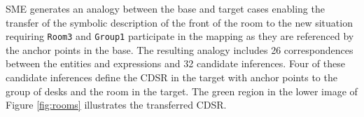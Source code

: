 \documentclass[letterpaper]{article}
\newcommand{\fw}[1]{\texttt{#1}}
\begin{document}
SME generates an analogy between the base and target cases enabling the transfer of the symbolic description of the front of the room to the new situation requiring \fw{Room3} and \fw{Group1} participate in the mapping as they are referenced by the anchor points in the base. The resulting analogy includes 26 correspondences between the entities and expressions and 32 candidate inferences. Four of these candidate inferences define the CDSR in the target with anchor points to the group of desks and the room in the target. The green region in the lower image of Figure \ref{fig:rooms} illustrates the transferred CDSR.



%
% 
\end{document}
